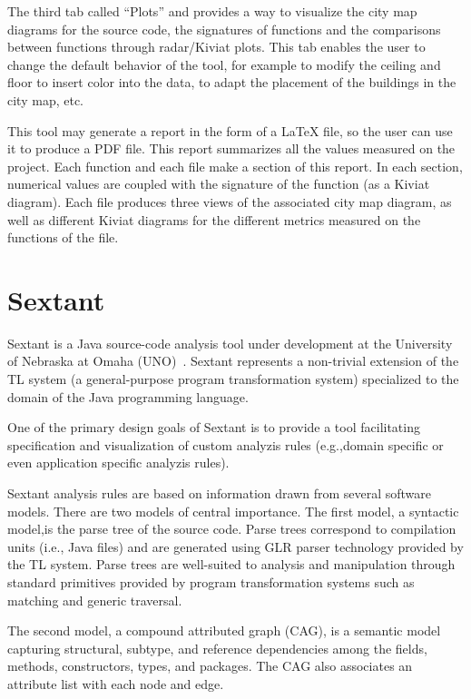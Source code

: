 The third tab called “Plots” and provides a way to visualize the city map diagrams for the source code, the signatures of functions and the comparisons between functions through radar/Kiviat plots. This tab enables the user to change the default behavior of the tool, for example to modify the ceiling and floor to insert color into the data, to adapt the placement of the buildings in the city map, etc. 

This tool  may  generate  a report  in  the  form  of  a  LaTeX  file,  so  the  user  can  use  it to produce  a  PDF  file.  This  
report summarizes all the values measured on the project. Each function and each file make a section of this report. In  each  section,  numerical  values  are  coupled  with  the  signature  of  the  function  (as  a  Kiviat  diagram).  Each  file  produces  three  views  of  the  associated  city  map  diagram,  as  well  as  different  Kiviat  diagrams  for  the  different metrics measured on the functions of the file. 

\section{Sextant}

Sextant is a Java source-code analysis tool under development at the University of Nebraska at Omaha (UNO)~\cite{sextant}. Sextant represents a non-trivial extension of the TL system (a general-purpose program
transformation system) specialized to the domain of the Java
programming language.

One of the primary design goals of Sextant is to provide a tool facilitating specification and visualization of custom analyzis rules (e.g.,domain specific or even application specific analyzis rules).

Sextant analysis rules are based on information drawn from several software models. There are two models of central importance. The first model, a syntactic model,is the parse tree of the source code. Parse trees correspond
to compilation units (i.e., Java files) and are generated using GLR parser technology provided by the TL system. Parse trees are well-suited to analysis and manipulation through standard primitives provided by program transformation systems such as matching and generic traversal.

The second model, a compound attributed graph (CAG), is a semantic model capturing structural, subtype, and reference dependencies among the fields, methods, constructors, types, and packages. The CAG also associates an attribute list with each node and edge.

